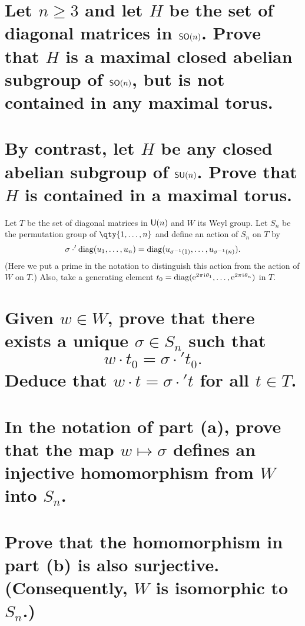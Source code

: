 \documentclass[
	pages,
	boxes,
	color=WildStrawberry
]{homework}
\begin{document}
\begin{problem}
\begin{parts}
	\part{Let $n \geq 3$ and let $H$ be the set of diagonal matrices in $\mathsf{SO}(n)$. Prove that $H$ is a maximal closed abelian subgroup of $\mathsf{SO}(n)$, but is not contained in any maximal torus.}\label{part:5a}
	\part{By contrast, let $H$ be any closed abelian subgroup of $\mathsf{SU}(n)$. Prove that $H$ is contained in a maximal torus.}\label{part:5b}
\end{parts}
\end{problem}

\begin{problem}
Let $T$ be the set of diagonal matrices in $\mathsf{U}(n)$ and $W$ its Weyl group. Let $S_n$ be the permutation group of $\qty{1, \ldots, n}$ and define an action of $S_n$ on $T$ by
\[
	\sigma \cdot' \operatorname{diag}(u_1, \ldots, u_n) = \operatorname{diag}(u_{\sigma^{-1}(1)}, \ldots, u_{\sigma^{-1}(n)}).
\]
(Here we put a prime in the notation to distinguish this action from the action of $W$ on $T$.) Also, take a generating element $t_0 = \operatorname{diag}(\mathrm{e}^{2\pi\mkern1mu\mathrm{i}\mkern1mu \theta_1}, \ldots, \mathrm{e}^{2\pi\mkern1mu\mathrm{i}\mkern1mu \theta_n})$ in $T$.
\begin{parts}
	\part{Given $w \in W$, prove that there exists a unique $\sigma \in S_n$ such that
		\[
			w \cdot t_0 = \sigma \cdot' t_0.
		\]
		Deduce that $w \cdot t = \sigma \cdot' t$ for all $t \in T$.}\label{part:6a}
	\part{In the notation of part (a), prove that the map $w \mapsto \sigma$ defines an injective homomorphism from $W$ into $S_n$.}\label{part:6b}
	\part{Prove that the homomorphism in part (b) is also surjective. (Consequently, $W$ is isomorphic to $S_n$.)}\label{part:6c}
\end{parts}

\end{problem}
\end{document}
